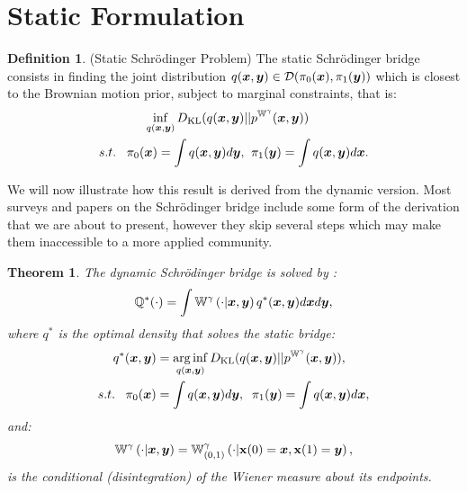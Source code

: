 \documentclass[a4paper,12pt,twoside,openright]{report}
\newtheorem{theorem}{Theorem}
\theoremstyle{definition}
\newtheorem{definition}{Definition}[section]
\begin{document}
\section{Static Formulation}
\begin{definition}\label{def:static_bridge}
    (Static Schrödinger Problem) The static Schrödinger bridge consists in finding the joint distribution $q({\bm{x}}, {\bm{y}}) \in {\mathcal{D}}(\pi_0({\bm{x}}), \pi_1({\bm{y}}))$ which is closest to the Brownian motion prior, subject to marginal constraints, that is:
    \begin{align}\label{eq:static_bridge}
        \inf_{q({\bm{x}},{\bm{y}})} D_{\mathrm{KL}} (q({\bm{x}},{\bm{y}})  &|| p^{\mathbb{W}^{\gamma}}({\bm{x}},{\bm{y}})) \nonumber \\
        s.t. \;\;\; \pi_0({\bm{x}}) = \int q({\bm{x}},{\bm{y}}) d{\bm{y}}, &\;\;\pi_1({\bm{y}}) = \int q({\bm{x}},{\bm{y}}) d{\bm{x}}.
    \end{align}
\end{definition}
We will now illustrate how this result is derived from the dynamic version. Most surveys and papers on the Schrödinger bridge include some form of the derivation that we are about to present, however they skip several steps which may make them inaccessible to a more applied community. 
\begin{theorem}\citep{follmer1988random}
    The dynamic Schrödinger bridge is solved by :
\begin{align}
    {\mathbb{Q}}^{*} (\cdot) =  \int \mathbb{W}^{\gamma} \left(\cdot | {\bm{x}}, {\bm{y}}\right)  q^{*}({\bm{x}},{\bm{y}}) d{\bm{x}} d{\bm{y}} ,
\end{align}
    where $q^*$ is the optimal density that solves the static bridge:
    \begin{align*}
        q^{*}({\bm{x}},{\bm{y}})& = \operatorname*{arg\,inf}_{q({\bm{x}},{\bm{y}})} D_{\mathrm{KL}} (q({\bm{x}},{\bm{y}})  || p^{\mathbb{W}^{\gamma}}({\bm{x}},{\bm{y}})),  \\
        s.t. \;\;\; \pi_0({\bm{x}}) &= \int q({\bm{x}},{\bm{y}}) d{\bm{y}}, \;\;\pi_1({\bm{y}}) = \int q({\bm{x}},{\bm{y}}) d{\bm{x}},
    \end{align*}
    and:
    \begin{align*}
        \mathbb{W}^{\gamma} \left(\cdot | {\bm{x}}, {\bm{y}}\right)  = \mathbb{W}_{(0,1)}^{\gamma}\left(\cdot | {\mathbf{x}}(0) ={\bm{x}}, {\mathbf{x}}(1) ={\bm{y}}\right),
    \end{align*}
    is the conditional (disintegration) of the Wiener measure about its endpoints.
\end{theorem} %
\end{document}
